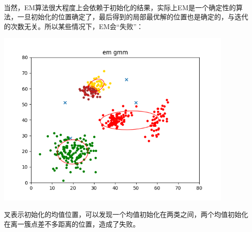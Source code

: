 \documentclass[hyperref,UTF8]{ctexart}
\begin{document}
\paragraph{}当然，EM算法很大程度上会依赖于初始化的结果，实际上EM是一个确定性的算法，一旦初始化的位置确定了，最后得到的局部最优解的位置也是确定的，与迭代的次数无关。所以某些情况下，EM会“失败”：\\
\centerline{\includegraphics[height=3.5in]{exp-results/EM_fail.png}}
\par 叉表示初始化的均值位置，可以发现一个均值初始化在两类之间，两个均值初始化在离一簇点差不多距离的位置，造成了失败。
\end{document}
